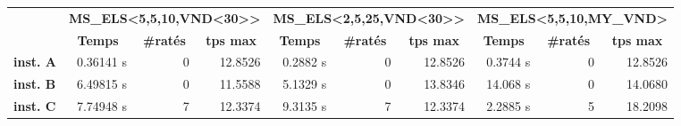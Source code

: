             \begin{table}[H]
                \centering
                \begin{tabular}{l|r|r|r|r|r|r|r|r|r|}
                \cline{2-10}
                                                                       & \multicolumn{3}{c|}{\textbf{MS\_ELS\textless5,5,10,VND\textless30\textgreater\textgreater}}                                           & \multicolumn{3}{c|}{\textbf{MS\_ELS\textless2,5,25,VND\textless30\textgreater\textgreater}}                                           & \multicolumn{3}{c|}{\textbf{MS\_ELS\textless5,5,10,MY\_VND\textgreater}}                                                              \\ \cline{2-10} 
                                                                       & \multicolumn{1}{c|}{\textbf{Temps}} & \multicolumn{1}{c|}{\textbf{\#ratés}} & \multicolumn{1}{c|}{\textbf{tps max}} & \multicolumn{1}{c|}{\textbf{Temps}} & \multicolumn{1}{c|}{\textbf{\#ratés}} & \multicolumn{1}{c|}{\textbf{tps max}} & \multicolumn{1}{c|}{\textbf{Temps}} & \multicolumn{1}{c|}{\textbf{\#ratés}} & \multicolumn{1}{c|}{\textbf{tps max}} \\ \hline
                \multicolumn{1}{|l|}{\textbf{inst. A}} & 0.36141 s                            & 0                                             & 12.8526                                          & 0.2882 s                            & 0                                             & 12.8526                                          & 0.3744 s                            & 0                                             & 12.8526                                          \\ \hline
                \multicolumn{1}{|l|}{\textbf{inst. B}} & 6.49815 s                           & 0                                             & 11.5588                                         & 5.1329 s                            & 0                                             & 13.8346                                         & 14.068 s                            & 0                                             & 14.0680                                         \\ \hline
                \multicolumn{1}{|l|}{\textbf{inst. C}} & 7.74948 s                           & 7                                             & 12.3374                                         & 9.3135 s                            & 7                                             & 12.3374                                         & 2.2885 s                            & 5                                             & 18.2098                                          \\ \hline

\end{tabular}
\end{table}

